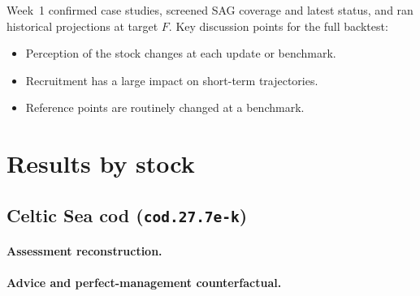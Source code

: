 \documentclass[11pt,a4paper]{extarticle}
\begin{document}

Week~1 confirmed case studies, screened SAG coverage and latest status, and
ran historical projections at target \(F\). Key discussion points for the
full backtest:
\begin{itemize}
  \item Perception of the stock changes at each update or benchmark.
  \item Recruitment has a large impact on short-term trajectories.
  \item Reference points are routinely changed at a benchmark.
\end{itemize}


\section{Results by stock}
\label{sec:results}


\subsection{Celtic Sea cod (\texttt{cod.27.7e-k})}
\label{sec:cod.27.7e-k}

\paragraph{Assessment reconstruction.}

\paragraph{Advice and perfect-management counterfactual.}
\end{document}
